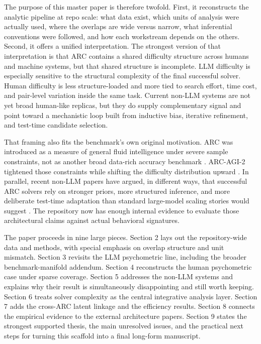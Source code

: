 The purpose of this master paper is therefore twofold. First, it reconstructs the analytic pipeline at repo scale: what data exist, which units of analysis were actually used, where the overlaps are wide versus narrow, what inferential conventions were followed, and how each workstream depends on the others. Second, it offers a unified interpretation. The strongest version of that interpretation is that ARC contains a shared difficulty structure across humans and machine systems, but that shared structure is incomplete. LLM difficulty is especially sensitive to the structural complexity of the final successful solver. Human difficulty is less structure-loaded and more tied to search effort, time cost, and pair-level variation inside the same task. Current non-LLM systems are not yet broad human-like replicas, but they do supply complementary signal and point toward a mechanistic loop built from inductive bias, iterative refinement, and test-time candidate selection.

That framing also fits the benchmark's own original motivation. ARC was introduced as a measure of general fluid intelligence under severe sample constraints, not as another broad data-rich accuracy benchmark \cite{chollet2019arc}. ARC-AGI-2 tightened those constraints while shifting the difficulty distribution upward \cite{arcprizefoundation2025}. In parallel, recent non-LLM papers have argued, in different ways, that successful ARC solvers rely on stronger priors, more structured inference, and more deliberate test-time adaptation than standard large-model scaling stories would suggest \cite{gao2025urm, hu2025varc, jolicoeur2025trm, mcgovern2025ttatrm}. The repository now has enough internal evidence to evaluate those architectural claims against actual behavioral signatures.

The paper proceeds in nine large pieces. Section 2 lays out the repository-wide data and methods, with special emphasis on overlap structure and unit mismatch. Section 3 revisits the LLM psychometric line, including the broader benchmark-manifold addendum. Section 4 reconstructs the human psychometric case under sparse coverage. Section 5 addresses the non-LLM systems and explains why their result is simultaneously disappointing and still worth keeping. Section 6 treats solver complexity as the central integrative analysis layer. Section 7 adds the cross-ARC latent linkage and the efficiency results. Section 8 connects the empirical evidence to the external architecture papers. Section 9 states the strongest supported thesis, the main unresolved issues, and the practical next steps for turning this scaffold into a final long-form manuscript.
